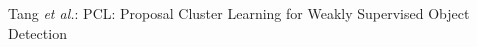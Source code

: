 \documentclass[10pt,journal,compsoc]{IEEEtran}
\begin{document}
%
{Tang \MakeLowercase{\textit{et al.}}: PCL: Proposal Cluster Learning for Weakly Supervised Object Detection}
% 






\end{document}
